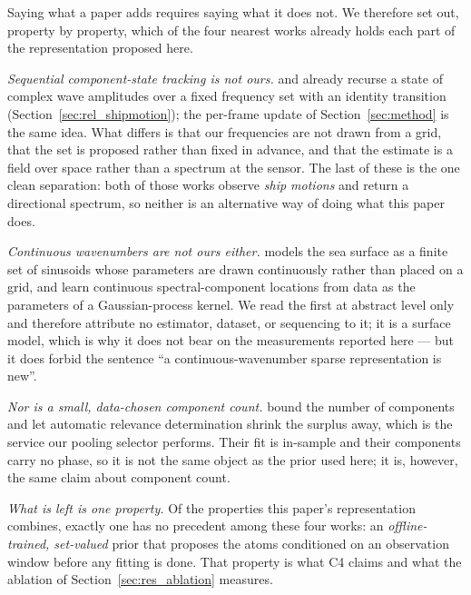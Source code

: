 \documentclass[review]{elsarticle}
\begin{document}
Saying what a paper adds requires saying what it does not. We therefore set out,
property by property, which of the four nearest works already holds each part of the
representation proposed here.

\emph{Sequential component-state tracking is not ours.}
\citet{Pascoal2017DirSpectra} and \citet{Kim2019InverseKF} already recurse a state of
complex wave amplitudes over a fixed frequency set with an identity transition
(Section~\ref{sec:rel_shipmotion}); the per-frame update of Section~\ref{sec:method}
is the same idea. What differs is that our frequencies are not drawn from a grid,
that the set is proposed rather than fixed in advance, and that the estimate is a
field over space rather than a spectrum at the sensor. The last of these is the one
clean separation: both of those works observe \emph{ship motions} and return a
directional spectrum, so neither is an alternative way of doing what this paper does.

\emph{Continuous wavenumbers are not ours either.}
\citet{Charnotskii2011SparseSpectrum} models the sea surface as a finite set of
sinusoids whose parameters are drawn continuously rather than placed on a grid, and
\citet{WilsonAdams2013} learn continuous spectral-component locations from data as
the parameters of a Gaussian-process kernel. We read the first at abstract level only
and therefore attribute no estimator, dataset, or sequencing to it; it is a surface
model, which is why it does not bear on the measurements reported here --- but it
does forbid the sentence ``a continuous-wavenumber sparse representation is new''.

\emph{Nor is a small, data-chosen component count.} \citet{WilsonAdams2013} bound the
number of components and let automatic relevance determination shrink the surplus
away, which is the service our pooling selector performs. Their fit is in-sample and
their components carry no phase, so it is not the same object as the prior used here;
it is, however, the same claim about component count.

\emph{What is left is one property.} Of the properties this paper's representation
combines, exactly one has no precedent among these four works: an
\emph{offline-trained, set-valued} prior that proposes the atoms conditioned on an
observation window before any fitting is done. That property is what C4 claims and
what the ablation of Section~\ref{sec:res_ablation} measures.
\end{document}

